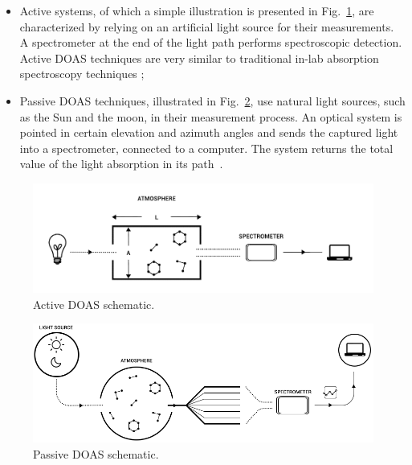 \begin{itemize}

        \item Active systems, of which a simple illustration is
            presented in Fig.~\ref{fig:activeSmall}, are characterized
            by relying on an artificial light source for their
            measurements. A spectrometer at the end of the light path
            performs spectroscopic detection. Active DOAS techniques are
            very similar to traditional in-lab absorption spectroscopy
            techniques \cite{Platt2007};

        \item Passive DOAS techniques, illustrated in
            Fig.~\ref{fig:passiveSchematic}, use natural light sources,
            such as the Sun and the moon, in their measurement process.
            An optical system is pointed in certain elevation and
            azimuth angles and sends the captured light into a
            spectrometer, connected to a computer. The system returns
            the total value of the light absorption in its
            path~\cite{Platt2007,Merlaud2013}.

\end{itemize}

 \begin{figure}[t]
    \includegraphics[width=14cm]{img/pdf/amt-2016-314-f02.pdf}
    \caption{Active DOAS schematic.}\label{fig:activeSmall}
  \end{figure}

  \begin{figure}[t]
      \includegraphics[width=14cm]{img/png/amt-2016-314-f03.png}
      \caption{Passive DOAS schematic.}\label{fig:passiveSchematic}
  \end{figure}

